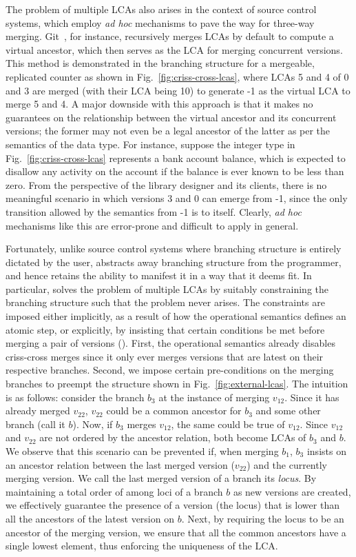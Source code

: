 The problem of multiple LCAs also arises in the context of source
control systems, which employ \emph{ad hoc} mechanisms to pave the way
for three-way merging.  Git~\cite{git}, for instance,
recursively merges LCAs by default to compute a virtual ancestor, which then
serves as the LCA for merging concurrent versions. This method is
demonstrated in the branching structure for a mergeable, replicated
counter as shown in Fig.~\ref{fig:criss-cross-lcas}, where LCAs 5 and
4 of 0 and 3 are merged (with their LCA being 10) to generate -1 as
the virtual LCA to merge 5 and 4. A major downside with this approach
is that it makes no guarantees on the relationship between the virtual
ancestor and its concurrent versions; the former may not even be a
legal ancestor of the latter as per the semantics of the data type.
For instance, suppose the integer type in
Fig.~\ref{fig:criss-cross-lcas} represents a bank account balance,
which is expected to disallow any activity on the account if the
balance is ever known to be less than zero.  From the perspective of
the library designer and its clients, there is no meaningful scenario
in which versions 3 and 0 can emerge from -1, since the only
transition allowed by the semantics from -1 is to itself.  Clearly,
\emph{ad hoc} mechanisms like this are error-prone and difficult to
apply in general.

Fortunately, unlike source control systems where branching structure
is entirely dictated by the user, \name abstracts away branching
structure from the programmer, and hence retains the ability to
manifest it in a way that it deems fit. In particular, \name solves
the problem of multiple LCAs by suitably constraining the branching
structure such that the problem never arises. The constraints are
imposed either implicitly, as a result of how the operational semantics
defines an atomic step, or explicitly, by insisting that certain
conditions be met before merging a pair of versions
(). First, the operational semantics already
disables criss-cross merges since it only ever merges versions that
are latest on their respective branches. Second, we impose certain
pre-conditions on the merging branches to preempt the structure shown
in Fig.~\ref{fig:external-lcas}. The intuition is as follows: consider
the branch $b_3$ at the instance of merging $v_{12}$. Since it has
already merged $v_{22}$, $v_{22}$ could be a common ancestor for $b_3$
and some other branch (call it $b$). Now, if $b_3$ merges $v_{12}$,
the same could be true of $v_{12}$. Since $v_{12}$ and $v_{22}$ are not
ordered by the ancestor relation, both become LCAs of
$b_3$ and $b$. We observe that this scenario can be prevented if, when
merging $b_1$, $b_3$ insists on an ancestor relation between the last
merged version ($v_{22}$) and the currently merging version.  We call
the last merged version of a branch its \emph{locus}. By maintaining a
total order of among loci of a branch $b$ as new versions are
created, we effectively guarantee the presence of a version (the
locus) that is lower than all the ancestors of the latest version on
$b$. Next, by requiring the locus to be an ancestor of the merging
version, we ensure that all the common ancestors have a single lowest
element, thus enforcing the uniqueness of the LCA.

